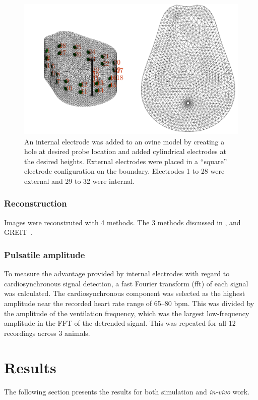 \begin{figure}
    \centering
	\includegraphics[width=\textwidth]{chapter7-internal_elec_motion/imgs/lamb_model.pdf} 
	\caption[Ovine model with internal probe]{\label{fig:internal_lamb_model} 
	An internal electrode was added to an ovine model by creating a hole at desired probe
	location and added cylindrical electrodes at the desired heights. External electrodes
	were placed in a ``square'' electrode configuration on the boundary. Electrodes 1 to 28 were 
	external and 29 to 32 were internal.}
\end{figure}

\subsubsection{Reconstruction}
Images were reconstruted with 4 methods. The 3 methods discussed in , 
and GREIT~\parencite{grychtol_3d_2016}.

\subsubsection{Pulsatile amplitude}
To measure the advantage provided by internal electrodes with regard to cardiosynchronous
signal detection, 
a fast Fourier transform (\acrshort{fft}) of each signal was calculated. 
The cardiosynchronous component was selected as the highest 
amplitude near the recorded heart rate range of 65--80 bpm.
This was divided by the amplitude of the ventilation frequency, which was the largest
low-frequency amplitude in the FFT of the detrended signal. 
This was repeated for all 12 recordings across 3 animals.

\section{Results}
The following section presents the results for both simulation and 
\emph{in-vivo} work.


